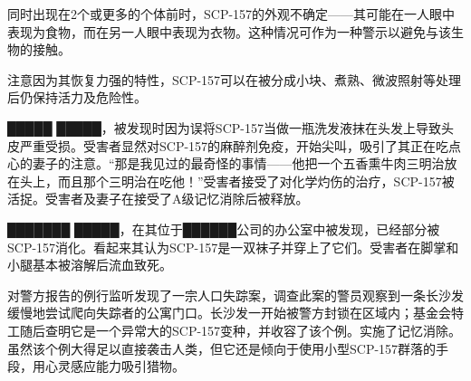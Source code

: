 同时出现在2个或更多的个体前时，SCP-157的外观不确定——其可能在一人眼中表现为食物，而在另一人眼中表现为衣物。这种情况可作为一种警示以避免与该生物的接触。

注意因为其恢复力强的特性，SCP-157可以在被分成小块、煮熟、微波照射等处理后仍保持活力及危险性。


 █████ █████，被发现时因为误将SCP-157当做一瓶洗发液抹在头发上导致头皮严重受损。受害者显然对SCP-157的麻醉剂免疫，开始尖叫，吸引了其正在吃点心的妻子的注意。“那是我见过的最奇怪的事情——他把一个五香熏牛肉三明治放在头上，而且那个三明治在吃他！”受害者接受了对化学灼伤的治疗，SCP-157被活捉。受害者及妻子在接受了A级记忆消除后被释放。

 ███████ █████，在其位于██████公司的办公室中被发现，已经部分被SCP-157消化。看起来其认为SCP-157是一双袜子并穿上了它们。受害者在脚掌和小腿基本被溶解后流血致死。

 对警方报告的例行监听发现了一宗人口失踪案，调查此案的警员观察到一条长沙发缓慢地尝试爬向失踪者的公寓门口。长沙发一开始被警方封锁在区域内；基金会特工随后查明它是一个异常大的SCP-157变种，并收容了该个例。实施了记忆消除。虽然该个例大得足以直接袭击人类，但它还是倾向于使用小型SCP-157群落的手段，用心灵感应能力吸引猎物。
